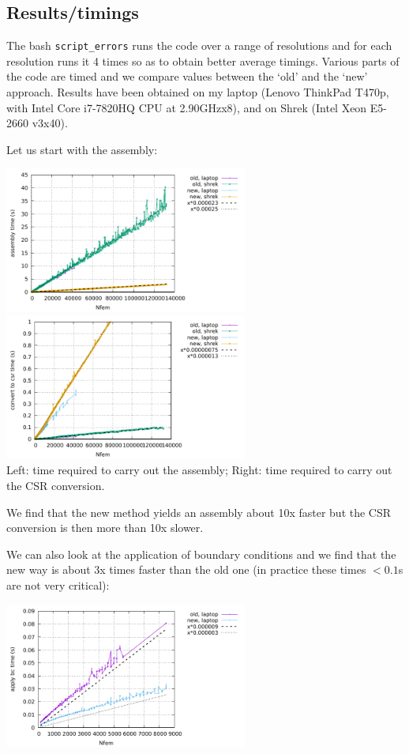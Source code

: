 \subsection*{Results/timings}

The bash {\tt script\_errors} runs the code over a range of resolutions 
and for each resolution runs it 4 times so as to obtain better average 
timings. Various parts of the code are timed and we compare values between 
the `old' and the `new' approach. Results have been obtained on my 
laptop (Lenovo ThinkPad T470p, with Intel Core i7-7820HQ CPU at 2.90GHzx8),
and on Shrek (Intel Xeon E5-2660 v3x40).

Let us start with the assembly:
\begin{center}
\includegraphics[width=8cm]{python_codes/fieldstone_176/RESULTS/assembly.pdf}
\includegraphics[width=8cm]{python_codes/fieldstone_176/RESULTS/convert2csr.pdf}\\
{\captionfont Left: time required to carry out the assembly; Right: time
required to carry out the CSR conversion.}
\end{center}
We find that the new method yields an assembly about 10x faster 
but the CSR conversion is then more than 10x slower. 

We can also look at the application of boundary conditions and
we find that the new way is about 3x times faster than the old one
(in practice these times $<0.1$s are not very critical):
\begin{center}
\includegraphics[width=8cm]{python_codes/fieldstone_176/RESULTS/bc.pdf}
\end{center}

